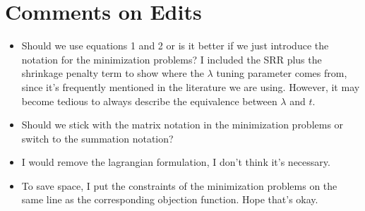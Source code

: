 \section{Comments on Edits}

\begin{itemize}
    \item Should we use equations 1 and 2 or is it better if we just introduce the notation for the minimization problems? I included the SRR plus the shrinkage penalty term to show where the $\lambda$ tuning parameter comes from, since it's frequently mentioned in the literature we are using. However, it may become tedious to always describe the equivalence between $\lambda$ and $t$. 
    \item Should we stick with the matrix notation in the minimization problems or switch to the summation notation? 
    \item I would remove the lagrangian formulation, I don't think it's necessary. 
    \item To save space, I put the constraints of the minimization problems on the same line as the corresponding objection function. Hope that's okay. 
\end{itemize}